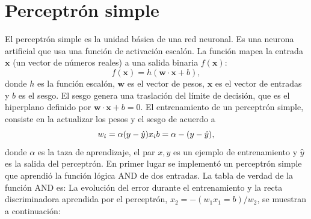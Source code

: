 \documentclass[12pt,a4paper]{article}
\begin{document}
\section{Perceptrón simple}
El perceptrón simple es la unidad básica de una red neuronal. Es una neurona artificial que usa una función de activación escalón. La función mapea la entrada $\mathbf{x}$ (un vector de números reales) a una salida binaria $f(\mathbf{x})$:
$$
f(\mathbf{x}) = h (\mathbf{w} \cdot \mathbf{x} + b),
$$
donde $h$ es la función escalón, $\mathbf{w}$ es el vector de pesos, $\mathbf{x}$ es el vector de entradas y $b$ es el sesgo. El sesgo genera una traslación del límite de decisión, que es el hiperplano definido por $\mathbf{w} \cdot \mathbf{x} + b = 0$.
El entrenamiento de un perceptrón simple, consiste en la actualizar los pesos y el sesgo de acuerdo a
$$
w_i = \alpha (y - \hat{y}) x_i\\
b = \alpha -(y - \hat{y}),
$$
donde $\alpha$ es la taza de aprendizaje, el par $x, y$ es un ejemplo de entrenamiento y $\hat{y}$ es la salida del perceptrón.
En primer lugar se implementó un perceptrón simple que aprendió la función lógica AND de dos entradas. La tabla de verdad de la función AND es:
La evolución del error durante el entrenamiento y la recta discriminadora aprendida por el perceptrón, $x_2 = -(w_1 x_1 = b) / w_2$, se muestran a continuación:
\end{document}

